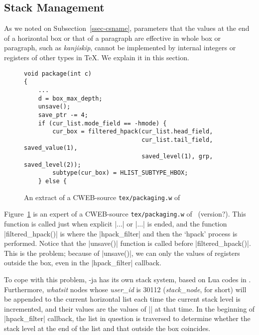 \documentclass{ajt}
\begin{document}
\subsection{Stack Management}
\label{ssec-stack}

As we noted on Subsection~\ref{ssec-csname}, parameters that the values
at the end of a horizontal box or that of a paragraph are effective in
whole box or paragraph, such as \emph{kanjiskip}, cannot be implemented by internal integers or
registers of other types in \TeX. We explain it in this section.

\begin{figure}
\begin{lstlisting}
void package(int c)
{
    ...
    d = box_max_depth;
    unsave();
    save_ptr -= 4;
    if (cur_list.mode_field == -hmode) {
        cur_box = filtered_hpack(cur_list.head_field,
                                 cur_list.tail_field, saved_value(1),
                                 saved_level(1), grp, saved_level(2));
        subtype(cur_box) = HLIST_SUBTYPE_HBOX;
    } else {
\end{lstlisting}
\caption{An extract of a CWEB-source \texttt{tex/packaging.w} of \LuaTeX}
\label{fig-ltsrc}
\end{figure}

Figure~\ref{fig-ltsrc} is an expert of a CWEB-source
\texttt{tex/packaging.w} of \LuaTeX\ (version?). This function is called
just when explicit |\hbox{...}| or |\vbox{...}| is ended, and the
function |filtered_hpack()| is where the |hpack_filter| and then the
`hpack' process is performed. Notice that the |unsave()| function is
called before |filtered_hpack()|. This is the problem; because of
|unsave()|, we can only the values of registers outside the box, even in
the |hpack_filter| callback.

To cope with this problem, \LuaTeX-ja has its own stack system, based on
Lua codes in \cite{stack-mail}. Furthermore, \emph{whatsit} nodes whose
\emph{user\_id} is 30112 (\emph{stack\_node}, for short) will be
appended to the current horizontal list each time the current stack
level is incremented, and their values are the values of
|\currentgrouplevel| at that time. In the beginning of |hpack_filter|
callback, the list in question is traversed to determine whether the
stack level at the end of the list and that outside the box coincides.
\end{document}
